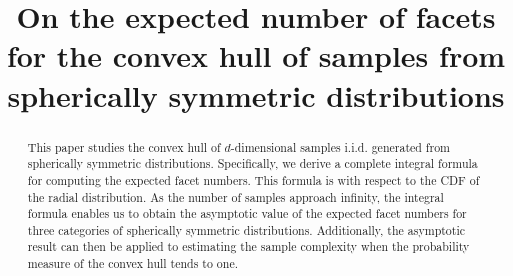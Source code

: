\documentclass{aptpub}
\begin{document}

\title{On the expected number of facets for the convex hull of samples from spherically symmetric distributions} %






\begin{abstract}
This paper studies the convex hull of $d$-dimensional samples i.i.d. generated from spherically symmetric distributions. Specifically, we derive a complete integral formula for
computing the expected facet numbers.
This formula is
with respect to the CDF of the radial distribution.
 As the number of samples approach infinity,
 the integral formula enables us to obtain the asymptotic value of the expected facet numbers
 for three categories of spherically symmetric distributions.
 Additionally, the asymptotic result can then be applied to estimating the sample complexity when the probability measure of the convex hull
 tends to one.
\end{abstract}



\ams{}{}%
\end{document}
